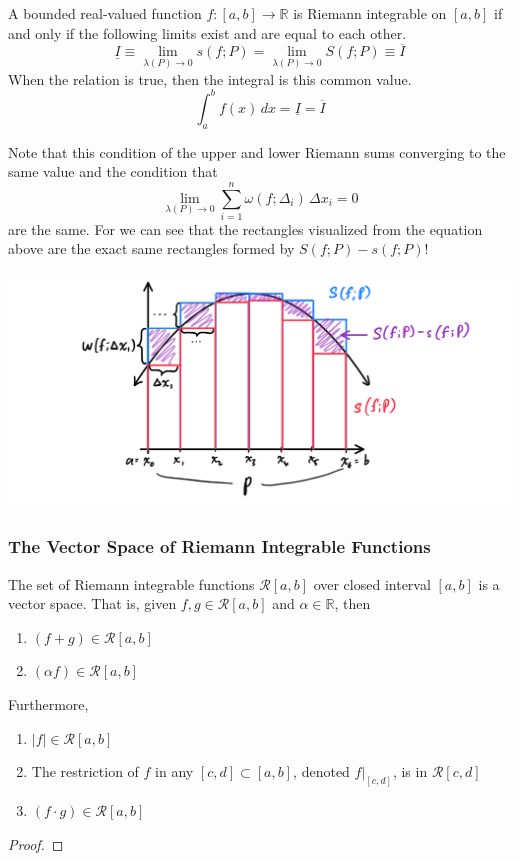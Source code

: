     \begin{theorem}
    A bounded real-valued function $f: [a, b] \longrightarrow \mathbb{R}$ is Riemann integrable on $[a, b]$ if and only if the following limits exist and are equal to each other. 
    \[\underline{I} \equiv \lim_{\lambda(P) \rightarrow 0} s(f; P) = \lim_{\lambda(P) \rightarrow 0} S(f; P) \equiv \overline{I}\]
    When the relation is true, then the integral is this common value. 
    \[\int_a^b f(x) \,dx = \underline{I} = \overline{I}\]
    \end{theorem}

    Note that this condition of the upper and lower Riemann sums converging to the same value and the condition that 
    \[\lim_{\lambda(P) \rightarrow 0} \sum_{i = 1}^n \omega (f; \Delta_i) \, \Delta x_i = 0\]
    are the same. For we can see that the rectangles visualized from the equation above are the exact same rectangles formed by $S(f; P) - s(f; P)$! 
    \begin{center}
        \includegraphics[scale=0.3]{img/Equivalent_Conditions_for_Integrability.PNG}
    \end{center}

    \subsubsection{The Vector Space of Riemann Integrable Functions}

    \begin{theorem}
    The set of Riemann integrable functions $\mathcal{R}[a, b]$ over closed interval $[a, b]$ is a vector space. That is, given $f, g \in \mathcal{R}[a, b]$ and $\alpha \in \mathbb{R}$, then
    \begin{enumerate}
      \item $(f + g) \in \mathcal{R}[a, b]$ 
      \item $(\alpha f) \in \mathcal{R}[a, b]$
    \end{enumerate}
    Furthermore, 
    \begin{enumerate}
      \item $|f| \in \mathcal{R}[a, b]$
      \item The restriction of $f$ in any $[c, d] \subset [a, b]$, denoted $f \big|_{[c,d]}$, is in $\mathcal{R}[c,d]$
      \item $(f \cdot g) \in \mathcal{R}[a, b]$
    \end{enumerate}
    \end{theorem}
    \begin{proof}

    \end{proof}

